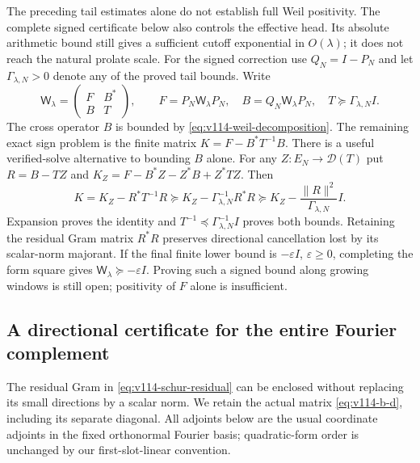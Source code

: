 \documentclass[11pt]{article}
\theoremstyle{remark}
\begin{document}
The preceding tail estimates alone do not establish full Weil positivity.
The complete signed certificate below also controls the effective head.
Its absolute arithmetic bound still gives a sufficient cutoff
exponential in $O(\lambda)$; it does not reach the natural prolate
scale. For the signed correction use $Q_N=I-P_N$ and let
$\Gamma_{\lambda,N}>0$ denote any of the proved tail bounds. Write
\[
 \mathsf W_\lambda=
 \begin{pmatrix}F&B^*\\B&T\end{pmatrix},\qquad
 F=P_N\mathsf W_\lambda P_N,\quad
 B=Q_N\mathsf W_\lambda P_N,\quad T\succeq\Gamma_{\lambda,N}I.
\]
The cross operator $B$ is bounded by \eqref{eq:v114-weil-decomposition}.
The remaining exact sign problem is the finite matrix
$K=F-B^*T^{-1}B$. There is a useful verified-solve alternative to
bounding $B$ alone. For any $Z:E_N\to\mathcal D(T)$ put
$R=B-TZ$ and $K_Z=F-B^*Z-Z^*B+Z^*TZ$. Then
\begin{equation}\label{eq:v114-schur-residual}
 K=K_Z-R^*T^{-1}R
 \succeq K_Z-\Gamma_{\lambda,N}^{-1}R^*R
 \succeq K_Z-\frac{\|R\|^2}{\Gamma_{\lambda,N}}I.
\end{equation}
Expansion proves the identity and $T^{-1}\preceq\Gamma_{\lambda,N}^{-1}I$
proves both bounds. Retaining the residual Gram matrix $R^*R$ preserves
directional cancellation lost by its scalar-norm majorant.
If the final finite lower bound is
$-\varepsilon I$, $\varepsilon\ge0$, completing the form square
gives $\mathsf W_\lambda\succeq-\varepsilon I$.
Proving such a signed bound along growing windows is still open;
positivity of $F$ alone is insufficient.

\subsection*{A directional certificate for the entire Fourier complement}

The residual Gram in \eqref{eq:v114-schur-residual} can be enclosed
without replacing its small directions by a scalar norm.  We retain
the actual matrix \eqref{eq:v114-b-d}, including its separate diagonal.
All adjoints below are the usual coordinate adjoints in the fixed
orthonormal Fourier basis; quadratic-form order is unchanged by our
first-slot-linear convention.
\end{document}
